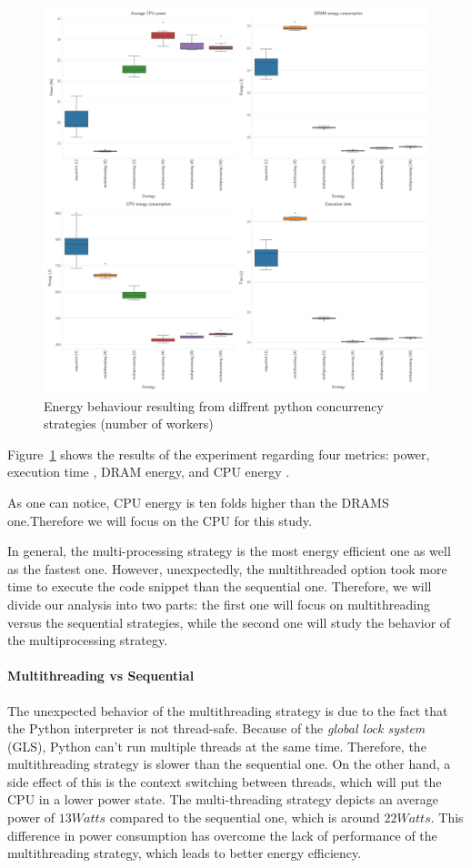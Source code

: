 \begin{figure}[!hbt]
    \centering
    \includegraphics[width=\linewidth]{imgs/python_multiprocessing}
    \caption{Energy behaviour resulting from diffrent python concurrency strategies (number of workers) }
    \label{fig:python_multiprocessing}
\end{figure}

Figure~\ref{fig:python_multiprocessing} shows the results of the experiment regarding four metrics: power, execution time , DRAM energy, and CPU energy .

As one can notice, CPU energy is ten folds higher than the DRAMS one.Therefore we will focus on the CPU for this study.

In general, the multi-processing strategy is the most energy efficient one as well as the fastest one. However, unexpectedly, the multithreaded option took more time to execute the code snippet than the sequential one.
Therefore, we will divide our analysis into two parts: the first one will focus on multithreading versus the sequential strategies, while the second one will study the behavior of the multiprocessing strategy.

\paragraph*{Multithreading vs Sequential}
The unexpected behavior of the multithreading strategy is due to the fact that the Python interpreter is not thread-safe.
Because of the \emph{global lock system} (GLS), Python can't run multiple threads at the same time. Therefore, the multithreading strategy is slower than the sequential one.
On the other hand, a side effect of this is the context switching between threads, which will put the CPU in a lower power state. The multi-threading strategy depicts an average power of $13 Watts$ compared to the sequential one, which is around $22 Watts$. This difference in power consumption has overcome the lack of performance of the multithreading strategy, which leads to better energy efficiency.


